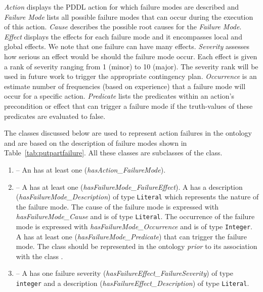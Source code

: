 \textit{Action} displays the PDDL action for which failure modes are described and \textit{Failure Mode} lists all possible failure modes that can 
occur during the execution of this action. \textit{Cause} describes the possible root causes for the \textit{Failure Mode}. \textit{Effect} 
displays the effects for each failure mode and it encompasses local and global effects. We note that one failure can have many effects. \textit{Severity} assesses how serious an effect would be should the failure mode occur. Each effect
is given a rank of severity ranging from 1 (minor) to 10 (major). The severity rank will be used in future work to trigger the appropriate contingency plan. \textit{Occurrence} is an estimate
number of frequencies (based on experience) that a failure mode will occur for a specific action. \textit{Predicate} lists the predicates within an action's precondition or effect
that can trigger a failure mode if the truth-values of these predicates are evaluated to false.




The classes discussed below are used to represent action failures in the  
ontology and are based on the description of failure modes shown in Table~\ref{tab:putpartfailure}. All these classes are subclasses of the  class.
\begin{enumerate}
\item {} -- An  has at least one  
(\emph{hasAction\_FailureMode}).
\item {} -- A  has at least one  
(\emph{hasFailureMode\_FailureEffect}). A  has a description 
(\emph{hasFailureMode\_Description}) of type \texttt{Literal} which represents the 
nature of the failure mode. The cause of the failure mode is expressed with 
\emph{hasFailureMode\_Cause} and is of type \texttt{Literal}. The occurrence of 
the failure mode is expressed with \emph{hasFailureMode\_Occurrence} and is of 
type \texttt{Integer}. A  has at least one  
(\emph{hasFailureMode\_Predicate}) that can trigger the failure mode. The class  should be represented in the 
ontology \textit{prior} to its association with the class .
\item {} -- A  has one failure severity 
(\emph{hasFailureEffect\_FailureSeverity}) of type \texttt{integer} and a 
description (\emph{hasFailureEffect\_Description}) of type \texttt{Literal}.
\end{enumerate}

